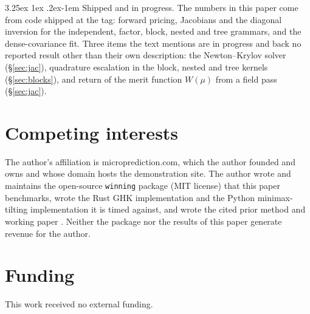 \documentclass[11pt]{article}
\makeatletter
\renewcommand\paragraph{\@startsection{paragraph}{4}{\z@}%
  {3.25ex \@plus1ex \@minus.2ex}{-1em}%
  {\normalfont\normalsize\itshape}}
\makeatother
\begin{document}
\paragraph{Shipped and in progress.} The numbers in this paper come from
code shipped at the tag: forward pricing, Jacobians and the diagonal
inversion for the independent, factor, block, nested and tree grammars,
and the dense-covariance fit. Three items the text mentions are in
progress and back no reported result other than their own description:
the Newton--Krylov solver (\S\ref{sec:jac}), quadrature escalation in
the block, nested and tree kernels (\S\ref{sec:blocks}), and return of
the merit function $W(\mu)$ from a field pass (\S\ref{sec:jac}).

\section*{Competing interests}
The author's affiliation is microprediction.com, which the author founded
and owns and whose domain hosts the demonstration site. The author wrote and maintains the open-source
\texttt{winning} package (MIT license) that this paper benchmarks, wrote
the Rust GHK implementation and the Python minimax-tilting
implementation it is timed against, and wrote the cited prior method
\citep{cotton2021} and working paper \citep{cottonsurvey}. Neither the
package nor the results of this paper generate revenue for the author.

\section*{Funding}
This work received no external funding.
\end{document}
